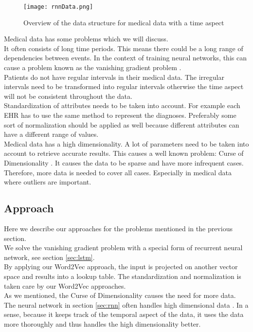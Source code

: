 \begin{figure}[!htb]
	\centering
	\texttt{[image: rnnData.png]}
	\caption{Overview of the data structure for medical data with a time aspect \cite{dl4jRnn:online}}
	\label{fig:rnnData}
\end{figure} 

Medical data has some problems which we will discuss.\\
It often consists of long time periods. This means there could be a long range of dependencies between events. In the context of training neural networks, this can cause a problem known as the vanishing gradient problem \cite{vanishingproblem:article}. \\
Patients do not have regular intervals in their medical data. The irregular intervals need to be transformed into regular intervals otherwise the time aspect will not be consistent throughout the data. \\
Standardization of attributes needs to be taken into account. For example each EHR has to use the same method to represent the diagnoses. Preferably some sort of normalization should be applied as well because different attributes can have a different range of values. \\
Medical data has a high dimensionality. A lot of parameters need to be taken into account to retrieve accurate results. This causes a well known problem: Curse of Dimensionality \cite {curseofdim:book}. It causes the data to be sparse and have more infrequent cases. Therefore, more data is needed to cover all cases. Especially in medical data where outliers are important. 


\subsection{Approach}

Here we describe our approaches for the problems mentioned in the previous section. \\
We solve the vanishing gradient problem with a special form of recurrent neural network, see section \ref{sec:lstm}. \\
By applying our Word2Vec approach, the input is projected on another vector space and results into a lookup table. The standardization and normalization is taken care by our Word2Vec approaches. \\
As we mentioned, the Curse of Dimensionality causes the need for more data. The neural network in section \ref{sec:rnn} often handles high dimensional data \cite{nn1:article} \cite{nn2:article} \cite{nn3:article} \cite{nn4:article}. In a sense, because it keeps track of the temporal aspect of the data, it uses the data more thoroughly and thus handles the high dimensionality better. \\

